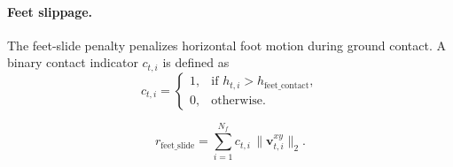 \paragraph{Feet slippage.}
The feet-slide penalty penalizes horizontal foot motion during ground contact.
A binary contact indicator $c_{t,i}$ is defined as
\begin{equation}
c_{t,i}
=
\begin{cases}
1, & \text{if } h_{t,i} > h_{\mathrm{feet\_contact}}, \\
0, & \text{otherwise}.
\end{cases}
\end{equation}

\begin{equation}
r_{\mathrm{feet\_slide}}
=
\sum_{i=1}^{N_f}
c_{t,i}
\,
\|\mathbf{v}_{t,i}^{xy}\|_2 .
\end{equation}



